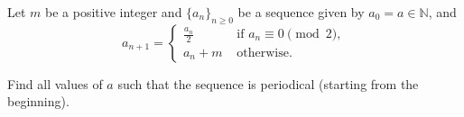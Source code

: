Let $m$ be a positive integer and $\{a_n\}_{n\geq 0}$ be a sequence given by $a_0 = a \in \mathbb N$,  and \[ a_{n+1} = \begin{cases} \displaystyle \frac{a_n}2 & \textrm { if } a_n \equiv 0 \pmod 2, \\ a_n + m & \textrm{ otherwise. } \end{cases}  \]

Find all values of $a$ such that the sequence is periodical (starting from the beginning).